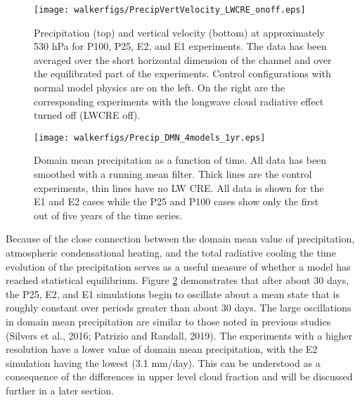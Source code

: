 \documentclass[11pt]{article}   	%
\begin{document}
\begin{figure}
  \centering
      \texttt{[image: walkerfigs/PrecipVertVelocity\_LWCRE\_onoff.eps]}
  \caption{Precipitation (top) and vertical velocity (bottom) at approximately 530 hPa for P100, P25, E2, and E1 experiments.  
  The data has been averaged over the short horizontal dimension of the channel and over the 
  equilibrated part of the experiments.  Control configurations with normal model physics are on the 
  left.  On the right are the corresponding experiments with the longwave cloud radiative effect turned
  off (LWCRE off).}
  \label{fig:precip_vertvel}
\end{figure}
%
%
%

\begin{figure}
  \centering
      \texttt{[image: walkerfigs/Precip\_DMN\_4models\_1yr.eps]}
  \caption{Domain mean precipitation as a function of time.  All data has been smoothed with a running mean filter.  
  Thick lines are the control experiments, thin lines have no LW CRE.  All data is shown for the E1 and E2 cases
  while the P25 and P100 cases show only the first out of five years of the time series.}
    \label{fig:precip_dom_mn}
\end{figure}

Because of the close connection between the domain mean value of precipitation, atmospheric condensational heating, and 
the total radiative cooling the time evolution of the precipitation serves as a useful measure of whether a model has 
reached statistical equilibrium.  Figure \ref{fig:precip_dom_mn} demonstrates that after about 30 days, the P25, E2, and E1
simulations begin to oscillate about a mean state that is roughly constant over periods greater than about 30 days. 
The large oscillations in domain mean precipitation are similar to those noted in previous studies 
(Silvers et al., 2016; Patrizio and Randall, 2019).   The experiments with a higher resolution have a lower value of domain
mean precipitation, with the E2 simulation having the lowest (3.1 mm/day).  This can be understood as a consequence
of the differences in upper level cloud fraction and will be discussed further in a later section.   
\end{document}
